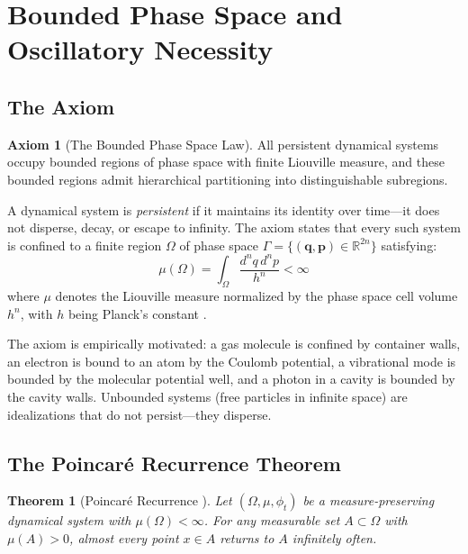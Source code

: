 \documentclass[11pt,a4paper]{article}
\newtheorem{theorem}{Theorem}[section]
\theoremstyle{definition}
\newtheorem{axiom}{Axiom}
\theoremstyle{remark}
\newcommand{\Real}{\mathbb{R}}
\begin{document}
\section{Bounded Phase Space and Oscillatory Necessity}
\label{sec:bounded_phase_space}

\subsection{The Axiom}

\begin{axiom}[The Bounded Phase Space Law]
\label{ax:bpsl}
All persistent dynamical systems occupy bounded regions of phase space with finite Liouville measure, and these bounded regions admit hierarchical partitioning into distinguishable subregions.
\end{axiom}

A dynamical system is \emph{persistent} if it maintains its identity over time---it does not disperse, decay, or escape to infinity. The axiom states that every such system is confined to a finite region $\Omega$ of phase space $\Gamma = \{(\mathbf{q}, \mathbf{p}) \in \Real^{2n}\}$ satisfying:
\begin{equation}
\mu(\Omega) = \int_\Omega \frac{d^n q \, d^n p}{h^n} < \infty
\label{eq:finite_measure}
\end{equation}
where $\mu$ denotes the Liouville measure normalized by the phase space cell volume $h^n$, with $h$ being Planck's constant \citep{planck1901}.

The axiom is empirically motivated: a gas molecule is confined by container walls, an electron is bound to an atom by the Coulomb potential, a vibrational mode is bounded by the molecular potential well, and a photon in a cavity is bounded by the cavity walls. Unbounded systems (free particles in infinite space) are idealizations that do not persist---they disperse.

\subsection{The Poincar\'e Recurrence Theorem}

\begin{theorem}[Poincar\'e Recurrence \citep{poincare1890}]
\label{thm:poincare}
Let $(\Omega, \mu, \phi_t)$ be a measure-preserving dynamical system with $\mu(\Omega) < \infty$. For any measurable set $A \subset \Omega$ with $\mu(A) > 0$, almost every point $x \in A$ returns to $A$ infinitely often.
\end{theorem}
\end{document}
